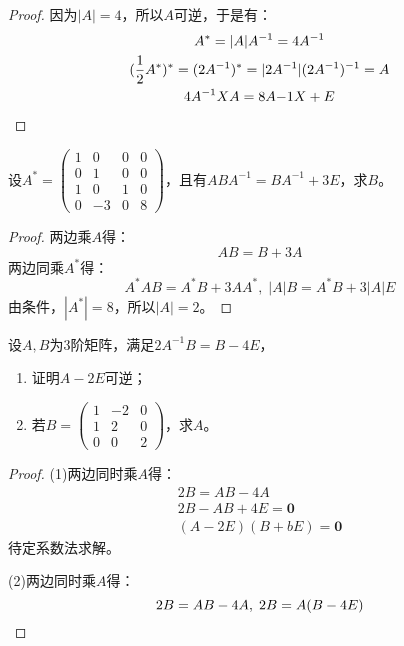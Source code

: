 \begin{proof}
	因为$|A|=4$，所以$A$可逆，于是有：
	\begin{gather*}
		A^*=|A|A^{-1}=4A^{-1} \\
		(\frac{1}{2}A^*)^*=(2A^{-1})^*=|2A^{-1}|(2A^{-1})^{-1}=A \\
		4A^{-1}XA=8A{-1}X+E\qedhere
	\end{gather*}
\end{proof}
\begin{theorem}
	设$A^*=
	\begin{pmatrix}
		1 & 0 & 0 & 0 \\
		0 & 1 & 0 & 0 \\
		1 & 0 & 1 & 0 \\
		0 & -3 & 0 & 8
	\end{pmatrix}$，且有$ABA^{-1}=BA^{-1}+3E$，求$B$。
\end{theorem}
\begin{proof}
	两边乘$A$得：
	\begin{equation*}
		AB=B+3A
	\end{equation*}
	两边同乘$A^*$得：
	\begin{equation*}
		A^*AB=A^*B+3AA^*,\;|A|B=A^*B+3|A|E
	\end{equation*}
	由条件，$|A^*|=8$，所以$|A|=2$。
\end{proof}
\begin{theorem}
	设$A,B$为$3$阶矩阵，满足$2A^{-1}B=B-4E$，
	\begin{enumerate}
		\item 证明$A-2E$可逆；
		\item 若$B=
		\begin{pmatrix}
			1 & -2 & 0 \\
			1 & 2 & 0 \\
			0 & 0 & 2
		\end{pmatrix}$，求$A$。
	\end{enumerate}
\end{theorem}
\begin{proof}
	(1)两边同时乘$A$得：
	\begin{gather*}
		2B=AB-4A \\
		2B-AB+4E=\mathbf{0} \\
		(A-2E)(B+bE)=\mathbf{0}
	\end{gather*}
	待定系数法求解。\par
	(2)两边同时乘$A$得：
	\begin{equation*}
		2B=AB-4A,\;2B=A(B-4E)\qedhere
	\end{equation*}
\end{proof}
